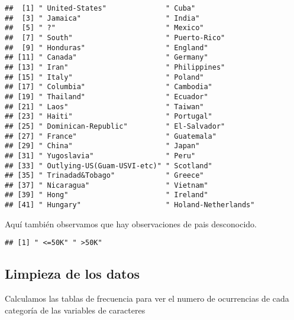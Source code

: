 \documentclass[]{article}
\newenvironment{Shaded}{\begin{snugshade}}{\end{snugshade}}
\newcommand{\KeywordTok}[1]{\textcolor[rgb]{0.13,0.29,0.53}{\textbf{#1}}}
\newcommand{\NormalTok}[1]{#1}
\newcommand{\OperatorTok}[1]{\textcolor[rgb]{0.81,0.36,0.00}{\textbf{#1}}}
\begin{document}
\begin{verbatim}
##  [1] " United-States"              " Cuba"                      
##  [3] " Jamaica"                    " India"                     
##  [5] " ?"                          " Mexico"                    
##  [7] " South"                      " Puerto-Rico"               
##  [9] " Honduras"                   " England"                   
## [11] " Canada"                     " Germany"                   
## [13] " Iran"                       " Philippines"               
## [15] " Italy"                      " Poland"                    
## [17] " Columbia"                   " Cambodia"                  
## [19] " Thailand"                   " Ecuador"                   
## [21] " Laos"                       " Taiwan"                    
## [23] " Haiti"                      " Portugal"                  
## [25] " Dominican-Republic"         " El-Salvador"               
## [27] " France"                     " Guatemala"                 
## [29] " China"                      " Japan"                     
## [31] " Yugoslavia"                 " Peru"                      
## [33] " Outlying-US(Guam-USVI-etc)" " Scotland"                  
## [35] " Trinadad&Tobago"            " Greece"                    
## [37] " Nicaragua"                  " Vietnam"                   
## [39] " Hong"                       " Ireland"                   
## [41] " Hungary"                    " Holand-Netherlands"
\end{verbatim}

Aquí también observamos que hay observaciones de pais desconocido.

\begin{Shaded}
\end{Shaded}

\begin{verbatim}
## [1] " <=50K" " >50K"
\end{verbatim}

\hypertarget{limpieza-de-los-datos}{%
\subsection{Limpieza de los datos}\label{limpieza-de-los-datos}}

Calculamos las tablas de frecuencia para ver el numero de ocurrencias de
cada categoría de las variables de caracteres
\end{document}
